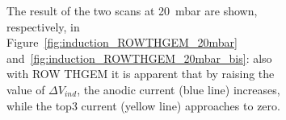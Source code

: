 \documentclass[a4paper, 11 pt]{article}
\newcommand{\Vind}{$\Delta V_{ind}$}
\newcommand{\Vthgem}{$\Delta V_{THGEM}$}
\begin{document}
\begin{figure}[htbp]
\begin{figure}[htbp]
The result of the two scans at 20~mbar are shown, respectively, in Figure~\ref{fig:induction_ROWTHGEM_20mbar} and~\ref{fig:induction_ROWTHGEM_20mbar_bis}: also with ROW THGEM it is apparent that by raising the value of \Vind{}, the anodic current (blue line) increases, while the top3 current (yellow line) approaches to zero.
\begin{figure}[!htb]
	\centering

\end{figure}
\end{figure}
\end{figure}
\end{document}
